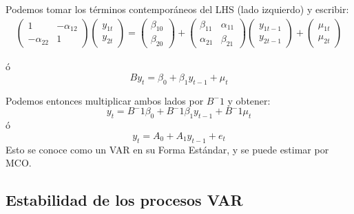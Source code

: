 	Podemos tomar los t\'erminos contempor\'aneos del LHS (lado izquierdo) y escribir:
	\begin{gather*}
	\begin{pmatrix} 1 & -\alpha_{12} \\ -\alpha_{22} & 1 \end{pmatrix}
	\begin{pmatrix} y_{1t} \\ y_{2t} \end{pmatrix}
	=
	\begin{pmatrix} \beta_{10} \\ \beta_{20} \end{pmatrix}
	+
	\begin{pmatrix} \beta_{11} & \alpha_{11} \\ \alpha_{21} & \beta_{21} \end{pmatrix}
	\begin{pmatrix} y_{1t-1} \\ y_{2t-1} \end{pmatrix}
	+
	\begin{pmatrix} \mu_{1t} \\ \mu_{2t} \end{pmatrix}
	\end{gather*}
	
	\'o
	\begin{equation*}
	By_{t} = \beta_{0} + \beta_{1} y_{t-1} + \mu_t
	\end{equation*}
	
	Podemos entonces multiplicar ambos lados por $B^-1$ y obtener:
	\begin{equation*}
	y_{t} = B^-1\beta_{0} + B^-1\beta_{1} y_{t-1} + B^-1\mu_t
	\end{equation*}
	\'o
	\begin{equation*}
	y_{t} = A_{0} + A_{1} y_{t-1} + e_t
	\end{equation*}
	Esto se conoce como un VAR en su Forma Est\'andar, y se puede estimar por MCO.
	
\pagebreak\subsection{Estabilidad de los procesos VAR}
	
